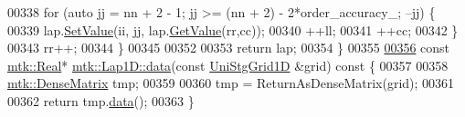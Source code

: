 \begin{DoxyCode}
00338     \textcolor{keywordflow}{for} (\textcolor{keyword}{auto} jj = nn + 2 - 1; jj >= (nn + 2) - 2*order\_accuracy\_; --jj) \{
00339       lap.\hyperlink{classmtk_1_1DenseMatrix_a784ce5784109ac86bfb9d8562b334b13}{SetValue}(ii, jj, lap.\hyperlink{classmtk_1_1DenseMatrix_a4b23ecbebd970b5eea915dbb50691024}{GetValue}(rr,cc));
00340       ++ll;
00341       ++cc;
00342     \}
00343     rr++;
00344   \}
00345 
00352 
00353   \textcolor{keywordflow}{return} lap;
00354 \}
00355 
\hypertarget{mtk__lap__1d_8cc_source_l00356}{}\hyperlink{classmtk_1_1Lap1D_ab2652725a8407c79247680c7bbd073b8}{00356} \textcolor{keyword}{const} \hyperlink{group__c01-roots_gac080bbbf5cbb5502c9f00405f894857d}{mtk::Real}* \hyperlink{classmtk_1_1Lap1D_ab2652725a8407c79247680c7bbd073b8}{mtk::Lap1D::data}(\textcolor{keyword}{const} \hyperlink{classmtk_1_1UniStgGrid1D}{UniStgGrid1D} &grid)\textcolor{keyword}{ const }\{
00357 
00358   \hyperlink{classmtk_1_1DenseMatrix}{mtk::DenseMatrix} tmp;
00359 
00360   tmp = ReturnAsDenseMatrix(grid);
00361 
00362   \textcolor{keywordflow}{return} tmp.\hyperlink{classmtk_1_1DenseMatrix_a0c33b8a9e01d157c61ddbdf807c25d84}{data}();
00363 \}
\end{DoxyCode}
